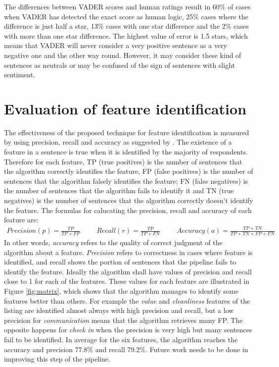 The differences between VADER scores and human ratings result in 60\% of cases when VADER has detected the exact score as human logic, 25\% cases where the difference is just half a star, 13\% cases with one star difference and the 2\% cases with more than one star difference. The highest value of error is 1.5 stars, which means that VADER will never consider a very positive sentence as a very negative one and the other way round. However, it may consider these kind of sentences as neutrals or may be confused of the sign of sentences with slight sentiment.

\section{Evaluation of feature identification}
The effectiveness of the proposed technique for feature identification is measured by using precision, recall and accuracy as suggested by \cite{huang2006performance}.
The existence of a feature in a sentence is true when it is identified by the majority of respondents. Therefore for each  feature, TP (true positives) is the number of sentences that the algorithm correctly identifies the feature, FP (false positives) is the number of sentences that the algorithm falsely identifies the feature; FN (false negatives) is the number of sentences that the algorithm fails to identify it and TN (true negatives) is the number of sentences that the algorithm correctly doesn't identify the feature. The formulas for calucating the precision, recall and accuracy of each feature are:
\begin{align}
Precision  (p) =\frac{TP}{TP+FP} \hspace{1cm}
Recall  (r) = \frac{TP}{TP + FN} \hspace{1cm}
Accuracy (a) = \frac{TP + TN}{TP+TN+FP+FN}
\end{align}
In other words, \textit{accuracy} refers to the quality of correct judgment of the algorithm about a feature.  \textit{Precision} refers to correctness in cases where feature is identified, and recall shows the portion of sentences that the pipeline fails to identify the feature. Ideally the algorithm shall have values of precision and recall close to 1 for each of the features.
These values for each feature are illustrated in Figure \ref{fig:matrix}, which shows that the algorithm manages to identify some features better than others. For example the \textit{value} and \textit{cleanliness} features of the listing are identified almost always with high precision and recall, but a low precision for \textit{communication} means that the algorithm retrieves many FP. The opposite happens for \textit{check in} when the precision is very high but many sentences fail to be identified. In average for the six features, the algorithm reaches the accuracy and precision 77.8\% and recall 79.2\%. Future work needs to be done in improving this step of the pipeline.
